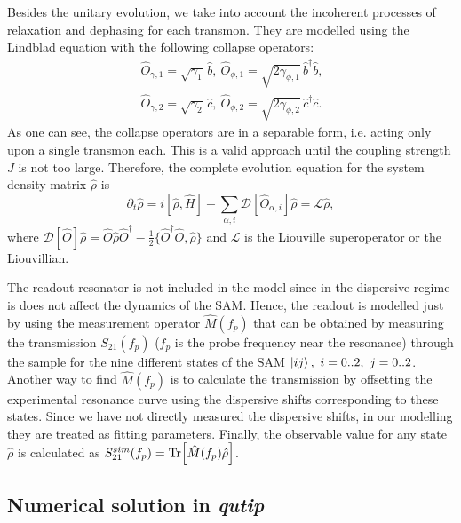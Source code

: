 \documentclass[%
 aip,
 amsmath,amssymb,
 reprint,%
]{revtex4-1}
\begin{document}
Besides the unitary evolution, we take into account the incoherent processes of relaxation and dephasing for each transmon. They are modelled using the Lindblad equation with the following collapse operators:
\begin{equation}\
\begin{split}
\hat{{O}}_{\gamma, 1} = \sqrt{\gamma_1}\, \hat b,\ 
\hat{{O}}_{\phi, 1} = \sqrt{2\gamma_{\phi,1}}\, \hat b^\dag \hat b,\\
\hat{{O}}_{\gamma,2} = \sqrt{\gamma_2}\, \hat c,\ 
\hat{{O}}_{\phi,2} = \sqrt{2\gamma_{ \phi,2}}\, \hat c^\dag \hat c.
\end{split}
\end{equation}
As one can see, the collapse operators are in a separable form, i.e. acting only upon a single transmon each. This is a valid approach until the coupling strength $J$ is not too large\cite{beaudoin2011dissipation}. Therefore, the complete evolution equation for the system density matrix $\hat \rho$ is
\begin{equation}
\partial_t \hat \rho = {i}[\hat \rho, \hat H] + \sum_{\alpha, i} \mathcal{D}[\hat{O}_{\alpha, i}] \hat \rho = \mathcal{L}\hat\rho, \label{eq:master}
\end{equation}
where $\mathcal{D}[\hat{{O}}]\hat \rho = \hat{{O}} \hat \rho \hat{{O}}^\dag - \frac{1}{2}\{ \hat{{O}}^\dag \hat{{O}}, \hat \rho\}$ and $\mathcal{L}$ is the Liouville superoperator or the Liouvillian.


The readout resonator is not included in the model since in the dispersive regime is does not affect the dynamics of the SAM. Hence, the readout is modelled just by using the measurement operator $\hat M(f_p)$ that can be obtained by measuring the transmission $S_{21}(f_p)$ ($f_p$ is the probe frequency near the resonance) through the sample for the nine different states of the SAM $\ket{ij},\ i=0..2,\ j=0..2$\cite{filipp2009two}. Another way to find $\hat M(f_p)$ is to calculate the transmission by offsetting the experimental resonance curve using the dispersive shifts corresponding to these states. Since we have not directly measured the dispersive shifts, in our modelling they are treated as fitting parameters. Finally, the observable value for any state $\hat \rho$ is calculated as $S_{21}^{sim}(f_p) = \Tr[\hat M(f_p) \hat \rho]$.


\subsection{Numerical solution in \textit{qutip}}
\end{document}
